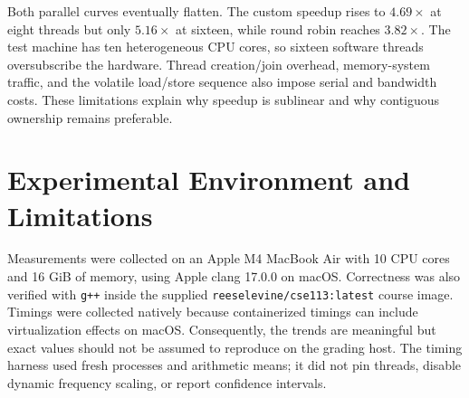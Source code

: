 \documentclass[11pt]{article}
\begin{document}
Both parallel curves eventually flatten.  The custom speedup rises to
$4.69\times$ at eight threads but only $5.16\times$ at sixteen, while
round robin reaches $3.82\times$.  The test machine has ten heterogeneous CPU
cores, so sixteen software threads oversubscribe the hardware.  Thread
creation/join overhead, memory-system traffic, and the volatile load/store
sequence also impose serial and bandwidth costs.  These limitations explain
why speedup is sublinear and why contiguous ownership remains preferable.

\section{Experimental Environment and Limitations}

Measurements were collected on an Apple M4 MacBook Air with 10 CPU cores and
16 GiB of memory, using Apple clang 17.0.0 on macOS.  Correctness was also
verified with \texttt{g++} inside the supplied
\texttt{reeselevine/cse113:latest} course image.  Timings were collected
natively because containerized timings can include virtualization effects on
macOS.  Consequently, the trends are meaningful but exact values should not
be assumed to reproduce on the grading host.  The timing harness used fresh
processes and arithmetic means; it did not pin threads, disable dynamic
frequency scaling, or report confidence intervals.
\end{document}
